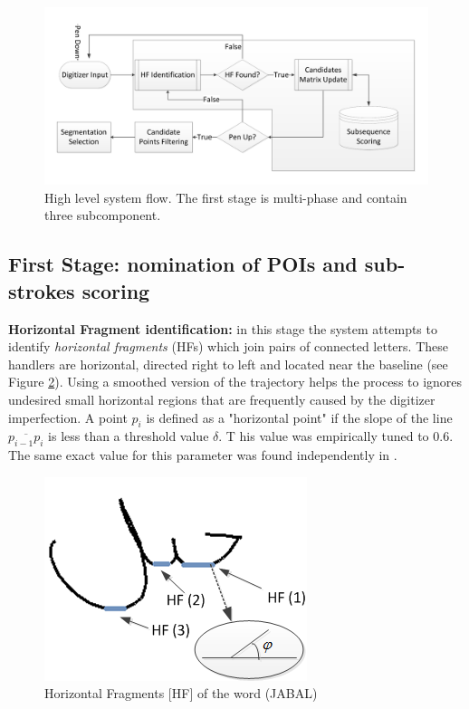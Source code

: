 \documentclass[10pt, conference, compsocconf]{IEEEtran}
\begin{document}
\begin{figure}
\centering
\includegraphics[width=1.3\columnwidth]{./figures/system_flow}
\caption{High level system flow. The first stage is multi-phase and contain three subcomponent. }
\label{fig:system_flow}
\end{figure}

\subsection{First Stage: nomination of POIs and sub-strokes scoring}

\textbf{Horizontal Fragment identification:} in this stage the system attempts to identify \emph{horizontal fragments} (HFs) which join pairs of connected letters. 
These handlers are horizontal, directed right to left and located near the baseline (see Figure  \ref{fig:horizontal_fragments}). 
Using a smoothed version of the trajectory helps the process to ignores undesired small horizontal regions that are frequently caused by the digitizer imperfection.  
A point $p_{i}$ is defined as a "horizontal point" if the slope of the line $\overline{p_{i-1}p_{i}}$ is less than a threshold value $\delta$. T
his value was empirically tuned to $0.6$. 
The same exact value for this parameter was found independently in \cite{daifallah2009recognition}.\\

\begin{figure}
\centering
\includegraphics[width=0.5\columnwidth]{./figures/horizontal_fragments}
\caption{Horizontal Fragments [HF] of the word (JABAL)}
\label{fig:horizontal_fragments}
\end{figure}
\end{document}
